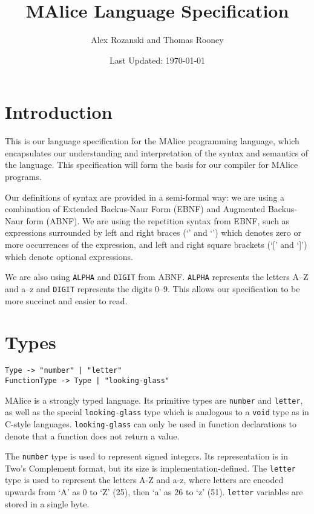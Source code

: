 \documentclass[a4wide, 11pt]{article}
\begin{document}
\title{MAlice Language Specification}

\author{Alex Rozanski and Thomas Rooney}

\date{Last Updated: \today}         %

\maketitle            %

\section{Introduction}

This is our language specification for the MAlice programming language, which encapsulates our understanding and interpretation of the syntax and semantics of the language. This specification will form the basis for our compiler for MAlice programs.

Our definitions of syntax are provided in a semi-formal way: we are using a combination of Extended Backus-Naur Form (EBNF) and Augmented Backus-Naur form (ABNF). We are using the repetition syntax from EBNF, such as expressions surrounded by left and right braces (`{' and `}') which denotes zero or more occurrences of the expression, and left and right square brackets (`[' and `]') which denote optional expressions.

We are also using \texttt{ALPHA} and \texttt{DIGIT} from ABNF. \texttt{ALPHA} represents the letters A--Z and a--z and \texttt{DIGIT} represents the digits 0--9. This allows our specification to be more succinct and easier to read.

\section{Types}

\begin{verbatim}
Type -> "number" | "letter"
FunctionType -> Type | "looking-glass"
\end{verbatim}

MAlice is a strongly typed language. Its primitive types are \texttt{number} and \texttt{letter}, as well as the special \texttt{looking-glass} type which is analogous to a \texttt{void} type as in C-style languages. \texttt{looking-glass} can only be used in function declarations to denote that a function does not return a value.

The \texttt{number} type is used to represent signed integers. Its representation is in Two's Complement format, but its size is implementation-defined. The \texttt{letter} type is used to represent the letters A-Z and a-z, where letters are encoded upwards from `A' as 0 to `Z' (25), then `a' as 26 to `z' (51). \texttt{letter} variables are stored in a single byte.
\end{document}
